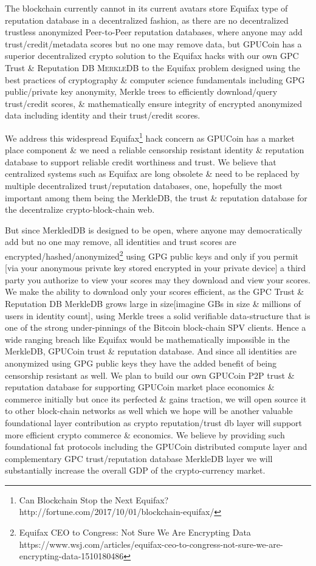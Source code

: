 The blockchain currently cannot in its current avatars store Equifax type of reputation database in a decentralized fashion, as there are no decentralized trustless anonymized Peer-to-Peer reputation databases, where anyone may add trust/credit/metadata scores but no one may remove data, but GPUCoin has a superior decentralized crypto solution to the Equifax hacks with our own GPC Trust \& Reputation DB \textsc{MerkleDB} to the Equifax problem designed using the best practices of cryptography \& computer science fundamentals including GPG public/private key anonymity, Merkle trees to efficiently download/query trust/credit scores, \& mathematically ensure integrity of encrypted anonymized data including identity and their trust/credit scores.

We address this widespread Equifax\footnote{Can Blockchain Stop the Next Equifax? http://fortune.com/2017/10/01/blockchain-equifax/} hack concern as GPUCoin has a market place component \& we need a reliable censorship resistant identity \& reputation database to support reliable credit worthiness and trust. We believe that centralized systems such as Equifax are long obsolete \& need to be replaced by multiple decentralized trust/reputation databases, one, hopefully the most important among them being the MerkleDB, the trust \& reputation database for the decentralize crypto-block-chain web. 

But since MerkledDB is designed to be open, where anyone may democratically add but no one may remove, all identities and trust scores are encrypted/hashed/anonymized\footnote{Equifax CEO to Congress: Not Sure We Are Encrypting Data https://www.wsj.com/articles/equifax-ceo-to-congress-not-sure-we-are-encrypting-data-1510180486} using GPG public keys and only if you permit [via your anonymous private key stored encrypted in your private device] a third party you authorize to view your scores may they download and view your scores. We make the ability to download only your scores efficient, as the GPC Trust \& Reputation DB MerkleDB grows large in size[imagine GBs in size \& millions of users in identity count], using Merkle trees a solid verifiable data-structure that is one of the strong under-pinnings of the Bitcoin block-chain SPV clients. Hence a wide ranging breach like Equifax would be mathematically impossible in the MerkleDB, GPUCoin trust \& reputation database.
And since all identities are anonymized using GPG public keys they have the added benefit of being censorship resistant as well. We plan to build our own GPUCoin P2P trust \& reputation database for supporting GPUCoin market place economics \& commerce initially but once its perfected \& gains traction, we will open source it to other block-chain networks as well which we hope will be another valuable foundational layer contribution as crypto reputation/trust db layer will support more efficient crypto commerce \& economics. We believe by providing such foundational fat protocols including the GPUCoin distributed compute layer and complementary GPC trust/reputation database MerkleDB layer we will substantially increase the overall GDP of the crypto-currency market.
